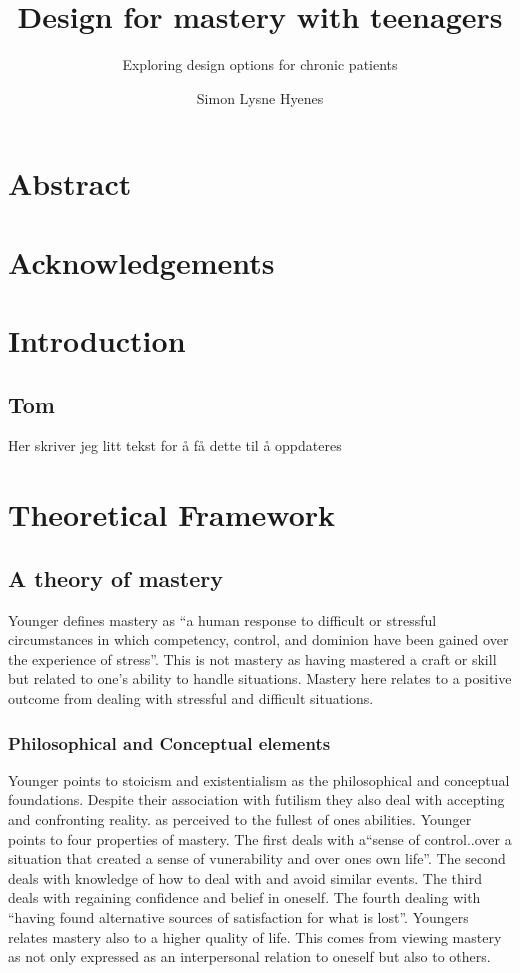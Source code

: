 \documentclass[UKenglish]{uiophd}
\author{Simon Lysne Hyenes}
\title{Design for mastery with teenagers}
\subtitle{Exploring design options for chronic patients}
\begin{document}
\frontmatter
\ififorside
\chapter*{Abstract}

\chapter*{Acknowledgements}
\clearpage
\tableofcontents
{}

\clearpage

\listoffigures
\listoftables
\mainmatter
\chapter{Introduction}
	\section{Tom}
	Her skriver jeg litt tekst for å få dette til å oppdateres

\chapter{Theoretical Framework}
	\section{A theory of mastery}
		Younger defines mastery as ``a human response to difficult or stressful circumstances in which competency, control, and dominion have been gained over the experience of stress''\cite[p.76]{Younger1991Theory}. This is not mastery as having mastered a craft or skill but related to one's ability to handle situations. Mastery here relates to a positive outcome from dealing with stressful and difficult situations.
	
		\subsection{Philosophical and Conceptual elements}
			Younger points to stoicism and existentialism as the philosophical and conceptual foundations. Despite their association with futilism they also deal with accepting and confronting reality. as perceived to the fullest of ones abilities. 
			Younger points to four properties of mastery. The first deals with a``sense of control..over a situation that created a sense of vunerability and over ones own life''\cite[p.81]{Younger1991Theory}. The second deals with knowledge of how to deal with and avoid similar events. The third deals with regaining confidence and belief in oneself. The fourth dealing with ``having found alternative sources of satisfaction for what is lost''\cite[p.81]{Younger1991Theory}. Youngers relates mastery also to a higher quality of life. This comes from viewing mastery as not only expressed as an interpersonal relation to oneself but also to others. 
\end{document}
